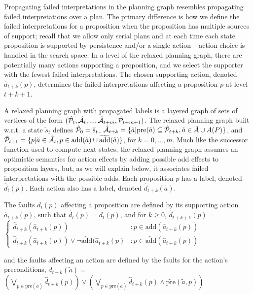 \documentclass{article}
\def\und#1{\noindent{\bf #1}:}
\def\und#1{\medskip{\noindent\bf #1:}}
\begin{document}
\und{Incomplete Domain Heuristics} Propagating failed interpretations in the planning graph resembles propagating failed interpretations over a plan.  The primary difference is how we define the failed interpretations for a proposition when the proposition has multiple sources of support; recall that we allow only serial plans and at each time each state proposition is supported by persistence and/or a single action -- action choice is handled in the search space. 
In a level of the relaxed planning graph, there are potentially many actions supporting a proposition, and we select the supporter with the fewest failed interpretations. The chosen supporting action, denoted $\hat{a}_{t+k}(p)$, determines the failed interpretations affecting a proposition $p$ at level $t+k+1$.


A relaxed planning graph with propagated labels is a layered
graph of sets of vertices of the form $(\hat{\cal P}_t, \hat{\cal A}_t, ..., \hat{\cal
A}_{t+m}, \hat{\cal P}_{t+m+1})$. The relaxed planning graph built w.r.t. a state $\tilde{s}_t$ defines $\hat{\cal P}_0 = \tilde{s}_t$, $\hat{\cal A}_{t+k} = \{ \tilde{a} | \text{pre}(\tilde{a}) \subseteq \hat{\cal P}_{t+k}, \tilde{a} \in \tilde{A} \cup A(P)\}$, and $\hat{\cal P}_{t+1} = \{p | \tilde{a} \in \hat{\cal A}_t, p \in \text{add}(\tilde{a}) \cup \widetilde{\text{add}}(\tilde{a})\}$, for $k = 0, ..., m$.  Much like the successor function used to compute next states, the relaxed planning graph assumes an optimistic semantics for action effects by adding possible add effects to proposition layers, but, as we will explain below, it associates failed interpretations with the possible adds.  Each proposition $p$ has a label, denoted $\hat{d}_t(p)$.  Each action also has a label, denoted $\widehat{d}_{t+k}(\tilde{a})$.

The faults $\hat{d}_t(p) $ affecting a proposition are defined by its supporting action $\hat{a}_{t+k}(p)$, such that $\hat{d}_t(p) = d_t(p)$, and for $k \geq 0$, $\hat{d}_{t+k+1}(p) =$ 
$\left\{\begin{array}{lll}
\widehat{d}_{t+k}(\hat{a}_{t+k}(p)) & : p \in \text{add}(\hat{a}_{t+k}(p))\\
\widehat{d}_{t+k}(\hat{a}_{t+k}(p)) \vee \neg\widetilde{\text{add}}(\hat{a}_{t+k}(p) & : p \in \widetilde{\text{add}}(\hat{a}_{t+k}(p))\end{array}\right.$

\noindent and the faults affecting an action are defined by the faults for the action's preconditions, 
$\widehat{d}_{t+k}(\tilde{a}) =$
$\left(\bigvee\limits_{p \in \text{pre}(\tilde{a}) }  \hat{d}_{t+k}(p)\right) \vee
\left(\bigvee\limits_{p \in \widetilde{\text{pre}}(\tilde{a})}   \hat{d}_{t+k}(p)  \wedge  \widetilde{\text{pre}}(\tilde{a}, p) \right)$%
\end{document}
